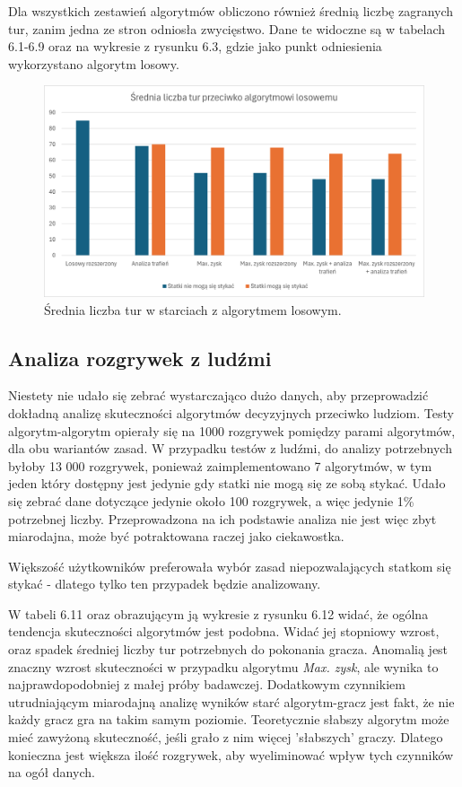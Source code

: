 Dla wszystkich zestawień algorytmów obliczono również średnią liczbę zagranych tur, zanim jedna ze stron odniosła zwycięstwo. Dane te widoczne są w tabelach 6.1-6.9 oraz na wykresie z rysunku 6.3, gdzie jako punkt odniesienia wykorzystano algorytm losowy.

\begin{figure}[!h]
    \label{fig:round-avg}
    \centering \includegraphics[width=0.9\linewidth]{img/round-count-avg.png}
    \caption{Średnia liczba tur w starciach z algorytmem losowym.}
\end{figure}


\subsection{Analiza rozgrywek z ludźmi}

Niestety nie udało się zebrać wystarczająco dużo danych, aby przeprowadzić dokładną analizę skuteczności algorytmów decyzyjnych przeciwko ludziom. Testy algorytm-algorytm opierały się na 1000 rozgrywek pomiędzy parami algorytmów, dla obu wariantów zasad. W przypadku testów z ludźmi, do analizy potrzebnych byłoby 13 000 rozgrywek, ponieważ zaimplementowano 7 algorytmów, w tym jeden który dostępny jest jedynie gdy statki nie mogą się ze sobą stykać. Udało się zebrać dane dotyczące jedynie około 100 rozgrywek, a więc jedynie 1\% potrzebnej liczby. Przeprowadzona na ich podstawie analiza nie jest więc zbyt miarodajna, może być potraktowana raczej jako ciekawostka.

Większość użytkowników preferowała wybór zasad niepozwalających statkom się stykać - dlatego tylko ten przypadek będzie analizowany.

W tabeli 6.11 oraz obrazującym ją wykresie z rysunku 6.12 widać, że ogólna tendencja skuteczności algorytmów jest podobna. Widać jej stopniowy wzrost, oraz spadek średniej liczby tur potrzebnych do pokonania gracza. Anomalią jest znaczny wzrost skuteczności w przypadku algorytmu \emph{Max. zysk}, ale wynika to najprawdopodobniej z małej próby badawczej. Dodatkowym czynnikiem utrudniającym miarodajną analizę wyników starć algorytm-gracz jest fakt, że nie każdy gracz gra na takim samym poziomie. Teoretycznie słabszy algorytm może mieć zawyżoną skuteczność, jeśli grało z nim  więcej 'słabszych' graczy. Dlatego konieczna jest większa ilość rozgrywek, aby wyeliminować wpływ tych czynników na ogół danych.

